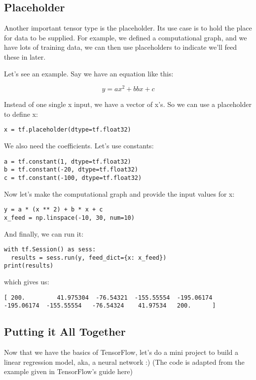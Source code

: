 \subsection{Placeholder}

Another important tensor type is the placeholder. Its use case is to hold the place for data to be supplied. For example, we defined a computational graph, and we have lots of training data, we can then use placeholders to indicate we'll feed these in later.

Let's see an example. Say we have an equation like this:

\begin{equation}
y = ax^2+bbx+c
\end{equation}

Instead of one single x input, we have a vector of x's. So we can use a placeholder to define x:

\begin{lstlisting}
x = tf.placeholder(dtype=tf.float32)
\end{lstlisting}
We also need the coefficients. Let's use constants:

\begin{lstlisting}
a = tf.constant(1, dtype=tf.float32)
b = tf.constant(-20, dtype=tf.float32)
c = tf.constant(-100, dtype=tf.float32)
\end{lstlisting}
Now let's make the computational graph and provide the input values for x:

\begin{lstlisting}
y = a * (x ** 2) + b * x + c
x_feed = np.linspace(-10, 30, num=10)
\end{lstlisting}
And finally, we can run it:

\begin{lstlisting}
with tf.Session() as sess:
  results = sess.run(y, feed_dict={x: x_feed})
print(results)
\end{lstlisting}
which gives us:

\begin{lstlisting}
[ 200.         41.975304  -76.54321  -155.55554  -195.06174  -195.06174  -155.55554   -76.54324    41.97534   200.      ]
\end{lstlisting}
\subsection{Putting it All Together}

Now that we have the basics of TensorFlow, let's do a mini project to build a linear regression model, aka, a neural network :) (The code is adapted from the example given in TensorFlow's guide here)

